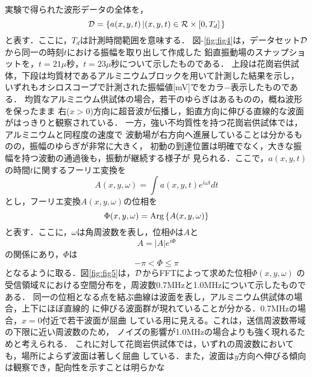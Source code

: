 ﻿%
実験で得られた波形データの全体を，
\begin{equation}
	{\cal D}=\left\{
		a(x,y,t)\left| (x,y,t)\in {\cal R}\times [0,T_d] \right.
	\right\}
	\label{eqn:dataset}
\end{equation}
と表す．ここに，$T_d$は計測時間範囲を意味する．
図-\ref{fig:fig4}は，データセット$\cal D$から同一の時刻$t$における振幅を取り出して作成した
鉛直振動場のスナップショットを，$t=21\mu$秒，$t=23\mu$秒について示したものである．
上段は花崗岩供試体，下段は均質材であるアルミニウムブロックを用いて計測した結果を示し，
いずれもオシロスコープで計測された振幅値[mV]でをカラ−表示したものである．
均質なアルミニウム供試体の場合，若干のゆらぎはあるものの，概ね波形を保ったまま
右($x>0$)方向に超音波が伝播し，鉛直方向に伸びる直線的な波面がはっきりと観察されている．
一方，強い不均質性を持つ花崗岩供試体では，アルミニウムと同程度の速度で
波動場が右方向へ進展していることは分かるものの，振幅のゆらぎが非常に大きく，
初動の到達位置は明確でなく，大きな振幅を持つ波動の通過後も，振動が継続する様子が
見られる．ここで，$a(x,y,t)$の時間$t$に関するフーリエ変換を
\begin{equation}
	A(x,y,\omega)=\int a(x,y,t)e^{i\omega t} dt
	\label{eqn:Fourier_t}
\end{equation}
とし，フーリエ変換$A(x,y,\omega)$の位相を
\begin{equation}
	\Phi(x,y,\omega)={\rm Arg}\left\{ A(x,y,\omega) \right\}
	\label{eqn:def_Phi}
\end{equation}
と表す．ここに，$\omega$は角周波数を表し，位相$\Phi$は$A$と
\begin{equation}
	A=\left| A \right|e^{i\Phi}
	\label{eqn:phi2A}
\end{equation}
の関係にあり，$\Phi$は
\begin{equation}
	-\pi < \Phi \leq \pi
	\label{eqn:dom_phi}
\end{equation}
となるように取る．図\ref{fig:fig5}は，$\cal D$からFFTによって求めた位相$\Phi(x,y,\omega)$
の受信領域$\cal R$における空間分布を，周波数0.7MHzと1.0MHzについて示したものである．
同一の位相となる点を結ぶ曲線は波面を表し，アルミニウム供試体の場合，上下にほぼ直線的
に伸びる波面群が現れていることが分かる．0.7MHzの場合，$x=0$付近で若干波面が屈曲
している用に見える。これは，送信周波数帯域の下限に近い周波数のため，
ノイズの影響が1.0MHzの場合よりも強く現れるためと考えられる．
これに対して花崗岩供試体では，いずれの周波数においても，場所によらず波面は著しく屈曲
している．また，波面は$y$方向へ伸びる傾向は観察でき，配向性を示すことは明らかな

